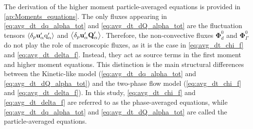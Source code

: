 The derivation of the higher moment particle-averaged equations is provided in \ref{ap:Moments_equations}.
The only fluxes appearing in \ref{eq:avg_dt_dq_alpha_tot} and \ref{eq:avg_dt_dQ_alpha_tot} are the fluctuation tensors $\left<\delta_{p} \textbf{u}_\alpha' \text q_\alpha'\right>$ and $\left<\delta_{p} \textbf{u}_\alpha' \textbf{Q}_\alpha'\right>$. 
Therefore, the non-convective fluxes $\bm\Phi_d^0$ and $\bm\Phi_\Gamma^0$ do not play the role of macroscopic fluxes, as it is the case in \ref{eq:avg_dt_chi_f} and \ref{eq:avg_dt_delta_f}. Instead, they act as source terms in the first moment and higher moment equations. 
This distinction is the main structural differences between the Kinetic-like model (\ref{eq:avg_dt_dq_alpha_tot} and \ref{eq:avg_dt_dQ_alpha_tot}) and the two-phase flow model (\ref{eq:avg_dt_chi_f} and \ref{eq:avg_dt_delta_f}). 
In this study, \ref{eq:avg_dt_chi_f} and \ref{eq:avg_dt_delta_f} are referred to as the phase-averaged equations, while \ref{eq:avg_dt_dq_alpha_tot} and \ref{eq:avg_dt_dQ_alpha_tot} are called the particle-averaged equations. 

